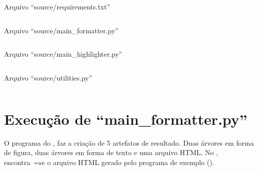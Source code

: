 \begin{code}
\caption{Arquivo ``source/requirements.txt''}
\label{requirementsTxt}
\inputminted{python3}{../source/requirements.txt}
\end{code}

\begin{code}
\caption{Arquivo ``source/main\_formatter.py''}
\label{MainFormatterPy}
\inputminted[firstline=39,firstnumber=1]{python3}{../source/main_formatter.py}
\end{code}

\begin{code}
\caption{Arquivo ``source/main\_highlighter.py''}
\label{MainHighlighterPy}
\inputminted[firstline=39,firstnumber=1]{python3}{../source/main_highlighter.py}
\end{code}

\begin{code}
\caption{Arquivo ``source/utilities.py''}
\label{utilitiesPy}
\inputminted[firstline=39,firstnumber=1]{python3}{../source/utilities.py}
\end{code}


\chapter[main\_formatter.py]{Execução de ``main\_formatter.py''}

O programa do ,
faz a criação de 5 artefatos de resultado.
Duas árvores em forma de figura,
duas árvores em forma de texto e
uma arquivo HTML.
No ,
encontra~=se o arquivo HTML gerado pelo programa de exemplo ().

